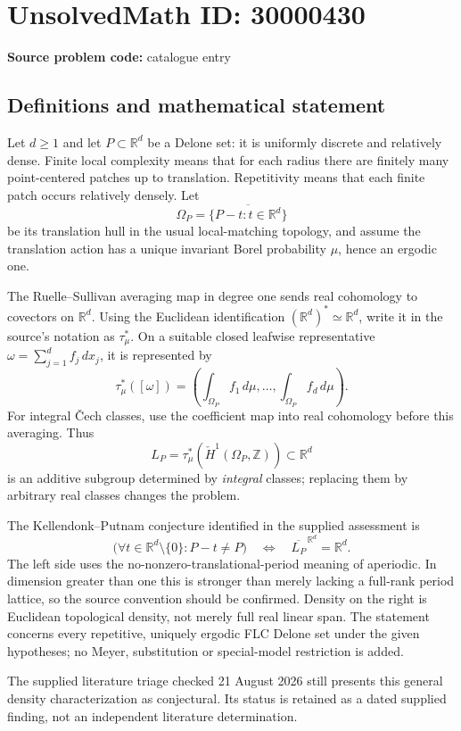 \documentclass[11pt]{article}
\newcommand{\Z}{\mathbb{Z}}
\newcommand{\R}{\mathbb{R}}
\begin{document}
\section*{UnsolvedMath ID: 30000430}
\textbf{Source problem code:} catalogue entry
\subsection{Definitions and mathematical statement}
Let $d\geq1$ and let $P\subset\R^d$ be a Delone set: it is uniformly discrete and relatively dense. Finite local complexity means that for each radius there are finitely many point-centered patches up to translation. Repetitivity means that each finite patch occurs relatively densely. Let
\[
 \Omega_P=\overline{\{P-t:t\in\R^d\}}
\]
be its translation hull in the usual local-matching topology, and assume the translation action has a unique invariant Borel probability $\mu$, hence an ergodic one.

The Ruelle--Sullivan averaging map in degree one sends real cohomology to covectors on $\R^d$. Using the Euclidean identification $(\R^d)^*\simeq\R^d$, write it in the source's notation as $\tau_\mu^*$. On a suitable closed leafwise representative $\omega=\sum_{j=1}^d f_j\,dx_j$, it is represented by
\[
 \tau_\mu^*([\omega])=
       \left(\int_{\Omega_P}f_1\,d\mu,\ldots,
             \int_{\Omega_P}f_d\,d\mu\right).
\]
For integral \v{C}ech classes, use the coefficient map into real cohomology before this averaging. Thus
\[
 L_P=\tau_\mu^*(\check H^1(\Omega_P,\Z))\subset\R^d
\]
is an additive subgroup determined by \emph{integral} classes; replacing them by arbitrary real classes changes the problem.

The Kellendonk--Putnam conjecture identified in the supplied assessment is
\[
 \bigl(\forall t\in\R^d\setminus\{0\}:P-t\ne P\bigr)
 \quad\Longleftrightarrow\quad
 \overline{L_P}^{\,\R^d}=\R^d.
\]
The left side uses the no-nonzero-translational-period meaning of aperiodic. In dimension greater than one this is stronger than merely lacking a full-rank period lattice, so the source convention should be confirmed. Density on the right is Euclidean topological density, not merely full real linear span. The statement concerns every repetitive, uniquely ergodic FLC Delone set under the given hypotheses; no Meyer, substitution or special-model restriction is added.

The supplied literature triage checked 21 August 2026 still presents this general density characterization as conjectural. Its status is retained as a dated supplied finding, not an independent literature determination.
\end{document}
